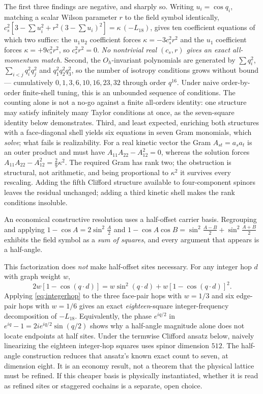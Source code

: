 \documentclass[11pt,a4paper]{article}
\theoremstyle{definition}
\theoremstyle{plain}
\theoremstyle{remark}
\begin{document}
The first three findings are negative, and sharply so. Writing
$u_i = \cos q_i$, matching a scalar Wilson parameter $r$ to the field
symbol identically,
$c_s^2[3 - \sum u_i^2 + r^2(3-\sum u_i)^2] = \kappa\,(-L_{18})$, gives ten
coefficient equations of which two suffice: the $u_1u_2$ coefficient forces
$\kappa = -3c_s^2r^2$ and the $u_1$ coefficient forces $\kappa = +9c_s^2r^2$,
so $c_s^2r^2 = 0$. \emph{No nontrivial real $(c_s,r)$ gives an exact
all-momentum match.} Second,
the $O_h$-invariant polynomials are generated by $\sum q_i^2$,
$\sum_{i<j}q_i^2q_j^2$ and $q_1^2q_2^2q_3^2$, so the number of isotropy
conditions grows without bound --- cumulatively $0, 1, 3, 6, 10, 16, 23, 32$
through order $q^{16}$. Under naive order-by-order finite-shell tuning,
this is an unbounded sequence of conditions. The counting alone is not a
no-go against a finite all-orders identity: one structure may satisfy
infinitely many Taylor conditions at once, as the seven-square identity
below demonstrates. Third, and
least expected, enriching both structures with a face-diagonal shell yields
six equations in seven Gram monomials, which \emph{solve}; what fails is
realizability. For a real kinetic vector the Gram $A_{st} = a_sa_t$ is an
outer product and must have $A_{11}A_{22}-A_{12}^2 = 0$, whereas the
solution forces $A_{11}A_{22}-A_{12}^2 = \tfrac29\kappa^2$. The required
Gram has rank two; the obstruction is structural, not arithmetic, and being
proportional to $\kappa^2$ it survives every rescaling. Adding the fifth
Clifford structure available to four-component spinors leaves the residual
unchanged; adding a third kinetic shell makes the rank conditions
insoluble.

An economical constructive resolution uses a half-offset carrier basis.
Regrouping and applying
$1-\cos A = 2\sin^2\!\tfrac A2$ and
$1-\cos A\cos B = \sin^2\!\tfrac{A-B}2+\sin^2\!\tfrac{A+B}2$ exhibits the
field symbol as a \emph{sum of squares}, and every argument that appears is
a half-angle.

This factorization does \emph{not} make half-offset sites necessary. For any
integer hop $d$ with graph weight $w$,
\begin{equation}
2w[1-\cos(q\!\cdot\!d)]
=w\sin^2(q\!\cdot\!d)+w[1-\cos(q\!\cdot\!d)]^2 .
\label{eq:integerhop}
\end{equation}
Applying \eqref{eq:integerhop} to the three face-pair hops with $w=1/3$
and six edge-pair hops with $w=1/6$ gives an exact
\emph{eighteen}-square integer-frequency decomposition of $-L_{18}$.
Equivalently, the phase $e^{iq/2}$ in
$e^{iq}-1=2i e^{iq/2}\sin(q/2)$ shows why a half-angle magnitude alone
does not locate endpoints at half sites. Under the termwise Clifford ansatz
below, naively linearizing the eighteen integer-hop squares uses spinor
dimension $512$. The half-angle construction reduces that ansatz's known
exact count to seven, at dimension eight. It is an economy result, not a theorem that the physical lattice must
be refined. If this cheaper basis is physically instantiated, whether it is
read as refined sites or staggered cochains is a separate, open choice.
\end{document}
